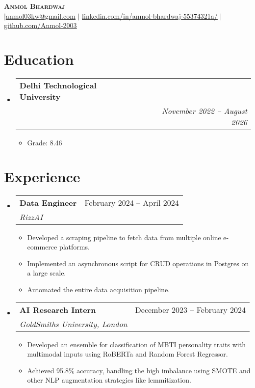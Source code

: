 \documentclass[letterpaper,11pt]{article}
\makeatletter
\newcommand{\resumeItem}[1]{
  \item\small{
    {#1 \vspace{-2pt}}
  }
}
\newcommand{\resumeSubheading}[4]{
  \vspace{-2pt}\item
    \begin{tabular*}{0.97\textwidth}[t]{l@{\extracolsep{\fill}}r}
      \textbf{#1} & #2 \\
      \textit{\small#3} & \textit{\small #4} \\
    \end{tabular*}\vspace{-7pt}
}
\newcommand{\resumeSubHeadingListStart}{\begin{itemize}[leftmargin=0.15in, label={}]}
\newcommand{\resumeSubHeadingListEnd}{\end{itemize}}
\newcommand{\resumeItemListStart}{\begin{itemize}}
\newcommand{\resumeItemListEnd}{\end{itemize}\vspace{-5pt}}
\makeatother
\begin{document}
\begin{center}
    \textbf{\Huge \scshape Anmol Bhardwaj} \\ \vspace{1pt}
    \small  $|$\href{mailto:anmol03kw@gmail.com}{\underline{anmol03kw@gmail.com}} $|$ 
    \href{https://www.linkedin.com/in/anmol-bhardwaj-55374321a/}{\underline{linkedin.com/in/anmol-bhardwaj-55374321a/}} $|$
    \href{https://github.com/Anmol-2003}{\underline{github.com/Anmol-2003}}
\end{center}


\section{Education}
  \resumeSubHeadingListStart
    \resumeSubheading
      {Delhi Technological University}{}
      {}{November 2022 -- August 2026}
      \resumeItemListStart
        \resumeItem{Grade: 8.46}
      \resumeItemListEnd
  \resumeSubHeadingListEnd


\section{Experience}
  \resumeSubHeadingListStart

    \resumeSubheading
      {Data Engineer}{February 2024 -- April 2024}
      {RizzAI}{}
      \resumeItemListStart
        \resumeItem{Developed a scraping pipeline to fetch data from multiple online e-commerce platforms.}
        \resumeItem{Implemented an asynchronous script for CRUD operations in Postgres on a large scale.}
        \resumeItem{Automated the entire data acquisition pipeline.}
      \resumeItemListEnd

    \resumeSubheading
      {AI Research Intern}{December 2023 -- February 2024}
      {GoldSmiths University, London}{}
      \resumeItemListStart
        \resumeItem{Developed an ensemble for classification of MBTI personality traits with multimodal inputs using RoBERTa and Random Forest Regressor.}
        \resumeItem{Achieved 95.8\% accuracy, handling the high imbalance using SMOTE and other NLP augmentation strategies like lemmitization.}
    \resumeItemListEnd
  \resumeSubHeadingListEnd


\end{document}
